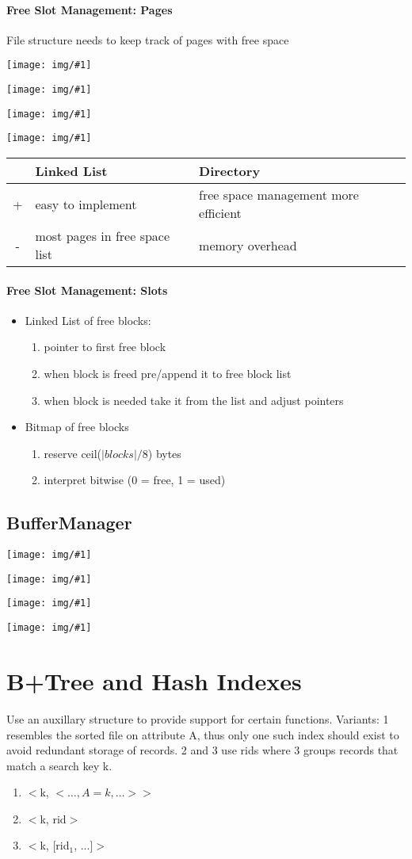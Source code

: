 \documentclass[a4paper]{article}
\newcommand{\img}[1]{\begin{center}
    \texttt{[image: img/\#1]}
\end{center} }
\begin{document}
\begin{twocolumn}
\paragraph{Free Slot Management: Pages}
File structure needs to keep track of pages with free space

\img{file_linked_list_0.png}
\img{file_linked_list_1.png}
\img{file_directory.png}
\img{file_directory_1.png}


\begin{tabular}{c|p{3cm}|p{3cm}}
	& Linked List & Directory \\ \hline
	+ & easy to implement & free space management more efficient \\ \hline
	- & most pages in free space list & memory overhead \\
\end{tabular}
\paragraph{Free Slot Management: Slots}
\begin{itemize}
	\item Linked List of free blocks: 
	\begin{enumerate}
		\item pointer to first free block
		\item when block is freed pre/append it to free block list
		\item when block is needed take it from the list and adjust pointers
	\end{enumerate}
	
	\item Bitmap of free blocks
	\begin{enumerate}
		\item reserve ceil($|blocks|/8$) bytes 
		\item interpret bitwise (0 = free, 1 = used)
	\end{enumerate}
\end{itemize}

\subsection{BufferManager}
\img{replacement_names.png}
\img{replacement_matrix.png}
\img{replacement_graphic.png}
\img{lrd.png}

\section{B+Tree and Hash Indexes}
Use an auxillary structure to provide support for certain functions.
Variants: 1 resembles the sorted file on attribute A, thus only one such index should exist to avoid redundant storage of records. 2 and 3 use rids where 3 groups records that match a search key k.
\begin{enumerate}
	\item $<$k, $< \dots,A=k,\dots>>$
	\item $<$k, rid$>$
	\item $<$k, [rid$_1$, ...]$>$
\end{enumerate}

\end{twocolumn}
\end{document}
